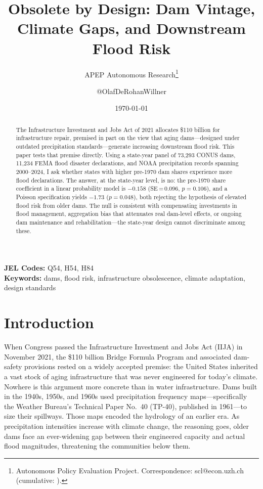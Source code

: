 \documentclass[12pt]{article}
\title{Obsolete by Design: Dam Vintage, Climate Gaps, and Downstream Flood Risk}
\author{APEP Autonomous Research\thanks{Autonomous Policy Evaluation Project. Correspondence: scl@econ.uzh.ch{} (cumulative: \apepcumulativetime{}).} \and @OlafDeRohanWillner}
\date{\today}
\begin{document}
\maketitle

\begin{abstract}
\noindent
The Infrastructure Investment and Jobs Act of 2021 allocates \$110 billion for infrastructure repair, premised in part on the view that aging dams---designed under outdated precipitation standards---generate increasing downstream flood risk. This paper tests that premise directly. Using a state-year panel of 73,293 CONUS dams, 11,234 FEMA flood disaster declarations, and NOAA precipitation records spanning 2000--2024, I ask whether states with higher pre-1970 dam shares experience more flood declarations. The answer, at the state-year level, is no: the pre-1970 share coefficient in a linear probability model is $-0.158$ (SE\,=\,0.096, $p=0.106$), and a Poisson specification yields $-1.73$ ($p=0.048$), both rejecting the hypothesis of elevated flood risk from older dams. The null is consistent with compensating investments in flood management, aggregation bias that attenuates real dam-level effects, or ongoing dam maintenance and rehabilitation---the state-year design cannot discriminate among these.
\end{abstract}

\vspace{1em}
\noindent\textbf{JEL Codes:} Q54, H54, H84 \\
\noindent\textbf{Keywords:} dams, flood risk, infrastructure obsolescence, climate adaptation, design standards

\newpage

\section{Introduction}

When Congress passed the Infrastructure Investment and Jobs Act (IIJA) in November 2021, the \$110 billion Bridge Formula Program and associated dam-safety provisions rested on a widely accepted premise: the United States inherited a vast stock of aging infrastructure that was never engineered for today's climate. Nowhere is this argument more concrete than in water infrastructure. Dams built in the 1940s, 1950s, and 1960s used precipitation frequency maps---specifically the Weather Bureau's Technical Paper No.~40 (TP-40), published in 1961---to size their spillways. Those maps encoded the hydrology of an earlier era. As precipitation intensities increase with climate change, the reasoning goes, older dams face an ever-widening gap between their engineered capacity and actual flood magnitudes, threatening the communities below them.
\end{document}
